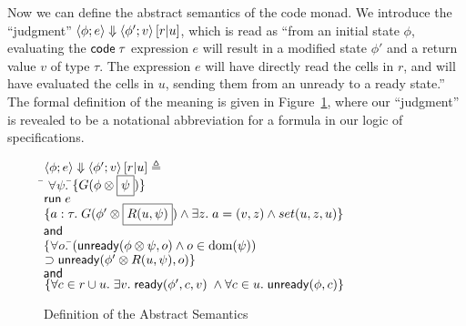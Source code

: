 \documentclass[natbib]{sigplanconf}
\begin{document}
Now we can define the abstract semantics of the code monad. We
introduce the ``judgment'' $\left<{\phi};{e}\right>\Downarrow\left<{\phi'};{v}\right>\left[{r}|{u}\right]$, which is
read as ``from an initial state $\phi$, evaluating the
$\mbox{\textsf{{code}}}\;{\tau}$ expression $e$ will result in a modified state
$\phi'$ and a return value $v$ of type $\tau$. The expression $e$ will
have directly read the cells in $r$, and will have evaluated the cells
in $u$, sending them from an unready to a ready state.''  The formal
definition of the meaning is given in Figure~\ref{abstract-semantics},
where our ``judgment'' is revealed to be a notational abbreviation for
a formula in our logic of specifications.


\begin{figure}
{\small
\begin{tabbing}
$\left<{\phi};{e}\right>\Downarrow\left<{\phi'};{v}\right>\left[{r}|{u}\right] \triangleq$ \\[0.5em]
\;\;\= $\forall \psi.\;$\=$\{{G(\phi \otimes \boxed{\psi})}\}$ \\
    \>                  \>${\mbox{\textsf{{run}}}\; e}$ \\
    \>                  \>$\{{a:\tau.\;
                             G(\phi' \otimes \boxed{R(u, \psi)})
                             \land \exists z.\; a = (v, z) \land set(u, z, u)}\}$ \\
    \>                  \>$\!\!\;\mbox{\textsf{{and}}}\;$ \\
    \>                  \>$\{\forall o.\;$\=$(\mbox{\textsf{{unready}}}({\phi \otimes \psi}, {o}) \land o \in \mbox{dom}({\psi}))$ \\
    \>                  \> \> $\supset \mbox{\textsf{{unready}}}({\phi' \otimes R(u, \psi)}, {o})\}$ \\
\>$\!\!\;\mbox{\textsf{{and}}}\;$ \\ 
\>$\{\forall c \in r \cup u.\; \exists v.\; \mbox{\textsf{{ready}}}({\phi'}, {c}, {v}) \;\land \forall c \in u.\; \mbox{\textsf{{unready}}}({\phi}, {c})\}$ 
\end{tabbing}
}
\caption{Definition of the Abstract Semantics}
\label{abstract-semantics}
\end{figure}
\end{document}
